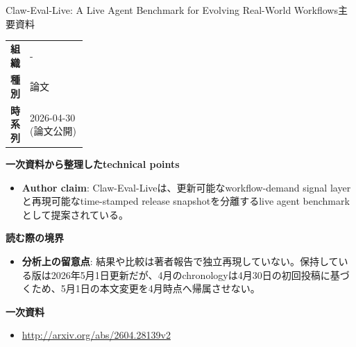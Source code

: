 \begin{technicalnote}{Claw-Eval-Live: A Live Agent Benchmark for Evolving Real-World Workflows}{主要資料}
\begingroup
\begin{tabularx}{\linewidth}{@{}>{\bfseries}p{0.22\linewidth}X@{}}
組織 & - \\
種別 & 論文 \\
時系列 & 2026-04-30 (論文公開) \\
\end{tabularx}
\smallskip
{\bfseries 一次資料から整理したtechnical points}
\begin{itemize}[leftmargin=1.5em,itemsep=0.35em]
\item \textbf{Author claim}: Claw-Eval-Liveは、更新可能なworkflow-demand signal layerと再現可能なtime-stamped release snapshotを分離するlive agent benchmarkとして提案されている。
\end{itemize}
\begin{minipage}{\linewidth}
{\bfseries 読む際の境界}
\begin{itemize}[leftmargin=1.5em,itemsep=0.35em]
\item \textbf{分析上の留意点}: 結果や比較は著者報告で独立再現していない。保持している版は2026年5月1日更新だが、4月のchronologyは4月30日の初回投稿に基づくため、5月1日の本文変更を4月時点へ帰属させない。
\end{itemize}
\begin{samepage}
{\bfseries 一次資料}
\begingroup\sloppy
\begin{itemize}[leftmargin=1.5em,itemsep=0.25em]
\item {\scriptsize\url{http://arxiv.org/abs/2604.28139v2}}
\end{itemize}
\endgroup
\end{samepage}
\end{minipage}
\endgroup
\end{technicalnote}
\medskip

